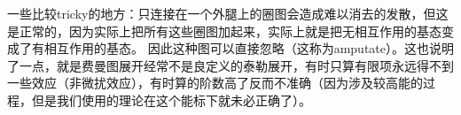 \documentclass[hyperref, UTF8, a4paper]{ctexart}
\begin{document}
一些比较tricky的地方：只连接在一个外腿上的圈图会造成难以消去的发散，但这是正常的，因为实际上把所有这些圈图加起来，实际上就是把无相互作用的基态变成了有相互作用的基态。
因此这种图可以直接忽略（这称为amputate）。这也说明了一点，就是费曼图展开经常不是良定义的泰勒展开，有时只算有限项永远得不到一些效应（非微扰效应），有时算的阶数高了反而不准确（因为涉及较高能的过程，但是我们使用的理论在这个能标下就未必正确了）。

\end{document}

